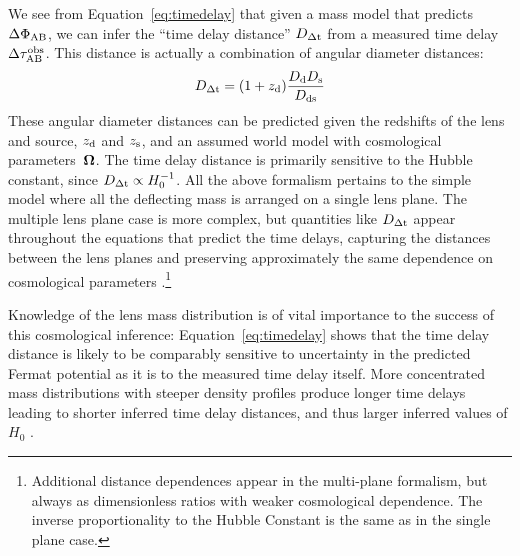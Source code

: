 
We see from Equation~\ref{eq:timedelay} that given a mass
model that predicts $\Delta \Phi_{\rm AB}$, we can infer the ``time
delay distance'' $D_{\Delta{\rm t}}$ from a measured time delay $\Delta \tau_{\rm AB}^{\rm obs}$.
This distance is actually a combination of angular diameter
distances:
%
\begin{equation}
    D_{\Delta{\rm t}} = (1+z_{\rm d}) \frac{D_{\rm d} D_{\rm s}}{D_{\rm ds}}  \label{eq:ddt}
\end{equation}
%
These angular diameter distances can be predicted given the redshifts
of the lens and source, $z_{\rm d}$ and $z_{\rm s}$, and an assumed world model with
cosmological parameters~$\boldsymbol{\Omega}$. The time delay distance is primarily
sensitive to the Hubble constant, since $D_{\Delta{\rm t}} \propto H_0^{-1}$.
All the above formalism pertains to the simple model where
all the deflecting mass is arranged on a single lens plane. The multiple
lens plane case is more complex, but quantities like $D_{\Delta{\rm t}}$ appear
throughout the equations that predict the time delays, capturing the
distances between the lens planes and preserving approximately the
same dependence on cosmological parameters \citep{Petters2001,McCullyEtal2014}.\footnote{Additional
distance dependences appear in the multi-plane formalism, but always as dimensionless
ratios with weaker cosmological dependence. The inverse proportionality
to the Hubble Constant is the same as in the single plane case.}


Knowledge of the lens mass distribution is of vital importance to the
success of this cosmological inference: Equation~\ref{eq:timedelay}
shows that the time delay distance is likely to be comparably
sensitive to uncertainty in
the predicted Fermat potential as it is to the measured time delay itself.
More concentrated mass distributions with steeper density
profiles produce longer time delays leading to shorter inferred time
delay distances, and thus larger inferred values of $H_0$ \citep{Wuc02,Koc02,Suyu12}.


